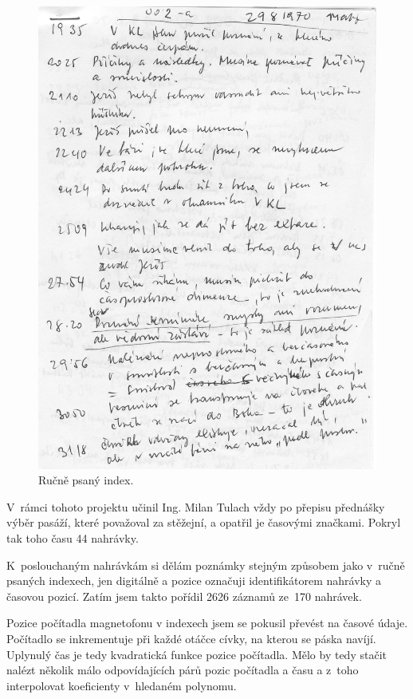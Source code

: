 \begin{figure}[htpb]
\includegraphics[scale=1.0]{rc/index-rucni.jpg}
\caption{Ručně psaný index.}
\label{fig:index-rucni}
\end{figure}

V~rámci tohoto projektu učinil Ing. Milan Tulach vždy po přepisu přednášky výběr
pasáží, které považoval za stěžejní, a opatřil je časovými značkami.
Pokryl tak toho času 44 nahrávky.

K~poslouchaným nahrávkám si dělám poznámky stejným způsobem jako v~ručně psaných
indexech, jen digitálně a pozice označuji identifikátorem
nahrávky a časovou pozicí. Zatím jsem takto pořídil 2626 záznamů ze~170 nahrávek.

Pozice počítadla magnetofonu v indexech
jsem se pokusil převést na časové údaje. Počítadlo se inkrementuje při každé
otáčce cívky, na kterou se páska navíjí. Uplynulý čas je tedy kvadratická funkce
pozice počítadla. Mělo by tedy stačit nalézt několik málo odpovídajících párů
pozic počítadla a času a z~toho interpolovat koeficienty v~hledaném polynomu.

